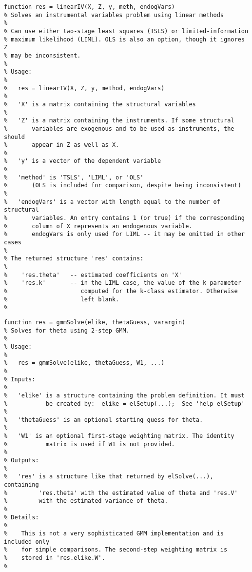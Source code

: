 
\begin{lstlisting}[commentstyle=\ttfamily]
function res = linearIV(X, Z, y, meth, endogVars)
% Solves an instrumental variables problem using linear methods
%
% Can use either two-stage least squares (TSLS) or limited-information
% maximum likelihood (LIML). OLS is also an option, though it ignores Z
% may be inconsistent.
%
% Usage:
%
%   res = linearIV(X, Z, y, method, endogVars)
%
%   'X' is a matrix containing the structural variables
%
%   'Z' is a matrix containing the instruments. If some structural
%       variables are exogenous and to be used as instruments, the should
%       appear in Z as well as X.
%
%   'y' is a vector of the dependent variable
%
%   'method' is 'TSLS', 'LIML', or 'OLS'
%       (OLS is included for comparison, despite being inconsistent)
%
%   'endogVars' is a vector with length equal to the number of structural
%       variables. An entry contains 1 (or true) if the corresponding
%       column of X represents an endogenous variable.
%       endogVars is only used for LIML -- it may be omitted in other cases
%
% The returned structure 'res' contains:
%
%    'res.theta'   -- estimated coefficients on 'X'
%    'res.k'       -- in the LIML case, the value of the k parameter
%                     computed for the k-class estimator. Otherwise
%                     left blank.
%
\end{lstlisting}

\begin{lstlisting}[commentstyle=\ttfamily]
function res = gmmSolve(elike, thetaGuess, varargin)
% Solves for theta using 2-step GMM.
%
% Usage:
%
%   res = gmmSolve(elike, thetaGuess, W1, ...)
%
% Inputs:
%
%   'elike' is a structure containing the problem definition. It must
%           be created by:  elike = elSetup(...);  See 'help elSetup'
%
%   'thetaGuess' is an optional starting guess for theta.
%
%   'W1' is an optional first-stage weighting matrix. The identity
%           matrix is used if W1 is not provided.
%
% Outputs:
%
%   'res' is a structure like that returned by elSolve(...), containing
%         'res.theta' with the estimated value of theta and 'res.V'
%         with the estimated variance of theta.
%    
% Details:
%
%    This is not a very sophisticated GMM implementation and is included only
%    for simple comparisons. The second-step weighting matrix is
%    stored in 'res.elike.W'.
%
\end{lstlisting}
